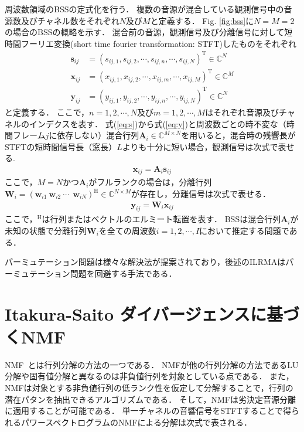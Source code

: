 周波数領域のBSSの定式化を行う．
複数の音源が混合している観測信号中の音源数及びチャネル数をそれぞれ$N$及び$M$と定義する．
Fig. \ref{fig:bss}に$N=M=2$の場合のBSSの概略を示す．
混合前の音源，観測信号及び分離信号に対して短時間フーリエ変換(short time fourier transformation: STFT)したものをそれぞれ
\begin{align}
\bm{s}_{ij} &= (s_{ij,1}, s_{ij,2}, \cdots, s_{ij,n}, \cdots, s_{ij,N})^{\mathrm{T}} \in \mathbb{C}^{N} \label{eq:s} \\
\bm{x}_{ij} &= (x_{ij,1}, x_{ij,2}, \cdots, x_{ij,m}, \cdots, x_{ij,M})^{\mathrm{T}} \in \mathbb{C}^{M} \label{eq:x} \\
\bm{y}_{ij} &= (y_{ij,1}, y_{ij,2}, \cdots, y_{ij,n}, \cdots, y_{ij,N})^{\mathrm{T}} \in \mathbb{C}^{N} \label{eq:y}
\end{align}
と定義する．
ここで，$n=1, 2,  \cdots, N$及び$m=1, 2, \cdots, M$はそれぞれ音源及びチャネルのインデクスを表す．
式(\ref{eq:s})から式(\ref{eq:y})と周波数ごとの時不変な（時間フレーム$j$に依存しない）混合行列$\bm{A}_i \in \mathbb{C}^{M\times N}$を用いると，混合時の残響長がSTFTの短時間信号長（窓長）$L$よりも十分に短い場合，観測信号は次式で表せる.
\begin{align}
  \bm{x}_{ij} = \bm{A}_i \bm{s}_{ij} \label{eq:xas}
\end{align}
ここで，$M=N$かつ$\bm{A}_i$がフルランクの場合は，分離行列$\bm{W}_{i} = (\bm{w}_{i1}~\bm{w}_{i2}~\cdots~ ~\bm{w}_{iN})^{\mathrm{H}} \in \mathbb{C}^{N \times M} $が存在し，分離信号は次式で表せる．
\begin{align}
  \bm{y}_{ij} = \bm{W}_i \bm{x}_{ij} \label{eq:ywj}
\end{align}
ここで，$^{\mathrm{H}}$は行列またはベクトルのエルミート転置を表す．
BSSは混合行列$\bm{A}_i$が未知の状態で分離行列$\bm{W}_{i}$を全ての周波数$i=1, 2, \cdots, I$において推定する問題である．

パーミュテーション問題は様々な解決法が提案されており，後述のILRMAはパーミュテーション問題を回避する手法である．


\section{Itakura-Saito ダイバージェンスに基づくNMF}
\label{sec:conv:isnmf}

NMF~\cite{NMF}とは行列分解の方法の一つである．
NMFが他の行列分解の方法であるLU分解や固有値分解と異なるのは非負値行列を対象としている点である．
また，NMFは対象とする非負値行列の低ランク性を仮定して分解することで，行列の潜在パタンを抽出できるアルゴリズムである．
そして，NMFは劣決定音源分離に適用することが可能である\cite{singlechsep, supNMF, MNMF_oz}．
単一チャネルの音響信号をSTFTすることで得られるパワースペクトログラムのNMFによる分解は次式で表される．


